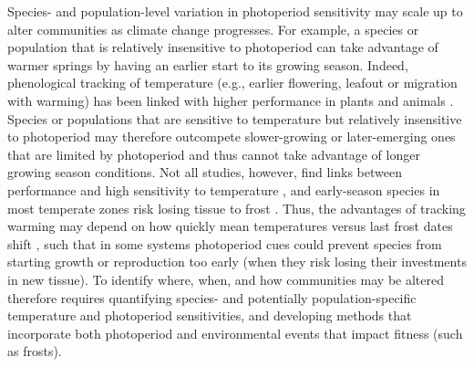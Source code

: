 \documentclass{article}
\begin{document}
\par Species- and population-level variation in photoperiod sensitivity may scale up to alter communities as climate change progresses. For example, a species or population that is relatively insensitive to photoperiod can take advantage of warmer springs by having an earlier start to its growing season. Indeed, phenological tracking of temperature (e.g., earlier flowering, leafout or migration with warming) has been linked with higher performance in plants and animals \citep{cleland2012,muir1994,willis2010}. Species or populations that are sensitive to temperature but relatively insensitive to photoperiod may therefore outcompete slower-growing or later-emerging ones that are limited by photoperiod and thus cannot take advantage of longer growing season conditions. Not all studies, however, find links between performance and high sensitivity to temperature \citep[e.g.,][]{block2020}, and early-season species in most temperate zones risk losing tissue to frost \citep{frostbook}. Thus, the advantages of tracking warming may depend on how quickly mean temperatures versus last frost dates shift \citep[e.g.,][]{inouye2002}, such that in some systems photoperiod cues could prevent species from starting growth or reproduction too early (when they risk losing their investments in new tissue). To identify where, when, and how communities may be altered therefore requires quantifying species- and potentially population-specific temperature and photoperiod sensitivities, and developing methods that incorporate both photoperiod and environmental events that impact fitness (such as frosts).
\end{document}
